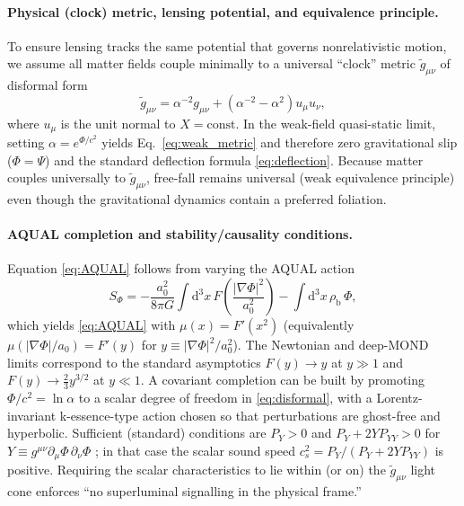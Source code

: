 \documentclass[12pt]{article}
\newcommand{\rhob}{\rho_{\mathrm{b}}}
\newcommand{\dd}{\mathrm{d}}
\newcommand{\alphaReg}{\alpha}
\begin{document}
\paragraph{Physical (clock) metric, lensing potential, and equivalence principle.}
To ensure lensing tracks the same potential that governs nonrelativistic motion, we assume all matter fields couple minimally to a universal ``clock'' metric $\tilde g_{\mu\nu}$ of disformal form
\begin{equation}
\tilde g_{\mu\nu}=\alphaReg^{-2} g_{\mu\nu}+\left(\alphaReg^{-2}-\alphaReg^{2}\right)u_{\mu}u_{\nu},
\label{eq:disformal}
\end{equation}
where $u_{\mu}$ is the unit normal to $X=\mathrm{const}$. In the weak-field quasi-static limit, setting $\alphaReg=e^{\Phi/c^{2}}$ yields Eq.~\eqref{eq:weak_metric} and therefore zero gravitational slip ($\Phi=\Psi$) and the standard deflection formula \eqref{eq:deflection}. Because matter couples universally to $\tilde g_{\mu\nu}$, free-fall remains universal (weak equivalence principle) even though the gravitational dynamics contain a preferred foliation.

\paragraph{AQUAL completion and stability/causality conditions.}
Equation \eqref{eq:AQUAL} follows from varying the AQUAL action \citep{BekensteinMilgrom1984}
\begin{equation}
S_{\Phi}= -\frac{a_{0}^{2}}{8\pi G}\int \dd^{3}x\, F\!\left(\frac{|\nabla\Phi|^{2}}{a_{0}^{2}}\right)
- \int \dd^{3}x\,\rhob\,\Phi,
\label{eq:AQUAL_action}
\end{equation}
which yields \eqref{eq:AQUAL} with $\mu(x)=F'(x^{2})$ (equivalently $\mu(|\nabla\Phi|/a_{0})=F'(y)$ for $y\equiv|\nabla\Phi|^{2}/a_{0}^{2}$). The Newtonian and deep-MOND limits correspond to the standard asymptotics $F(y)\rightarrow y$ at $y\gg 1$ and $F(y)\rightarrow \tfrac{2}{3}y^{3/2}$ at $y\ll 1$. A covariant completion can be built by promoting $\Phi/c^{2}=\ln\alphaReg$ to a scalar degree of freedom in \eqref{eq:disformal}, with a Lorentz-invariant k-essence-type action chosen so that perturbations are ghost-free and hyperbolic. Sufficient (standard) conditions are $P_{Y}>0$ and $P_{Y}+2Y P_{YY}>0$ for $Y\equiv g^{\mu\nu}\partial_{\mu}\Phi\,\partial_{\nu}\Phi$ \citep{GarrigaMukhanov1999}; in that case the scalar sound speed $c_{s}^{2}=P_{Y}/(P_{Y}+2Y P_{YY})$ is positive. Requiring the scalar characteristics to lie within (or on) the $\tilde g_{\mu\nu}$ light cone enforces ``no superluminal signalling in the physical frame.''
\end{document}
